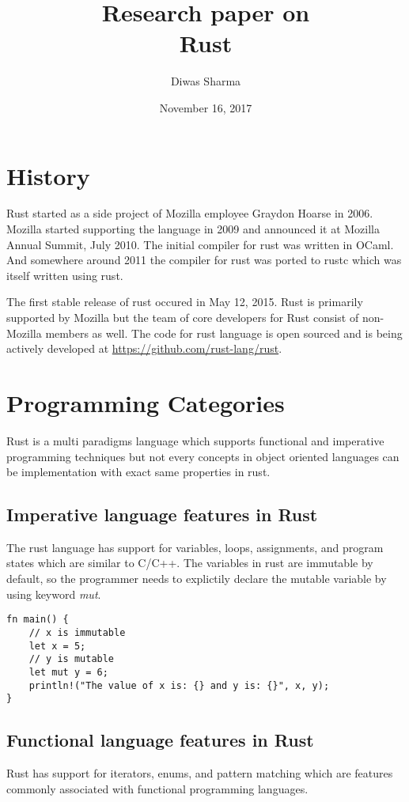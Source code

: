 \documentclass[12pt, titlepage]{article}
\title{\large{Research paper} on \\ \textbf{Rust}}
\author{Diwas Sharma}
\date{November 16, 2017}
\begin{document}
\maketitle

\section{History}
Rust started as a side project of Mozilla employee Graydon Hoarse in 2006. Mozilla started supporting the language in
2009 and announced it at Mozilla Annual Summit, July 2010\cite{ProjectServo}. The initial compiler for rust was written
in OCaml. And somewhere around 2011 the compiler for rust was ported to rustc which was itself written using rust.

The first stable release of rust occured in May 12, 2015\cite{AnnounceRust}. Rust is primarily supported
by Mozilla but the team of core developers for Rust consist of non-Mozilla members as well. The
code for rust language is open sourced and is being actively developed at \href{https://github.com/rust-lang/rust}{https://github.com/rust-lang/rust}.

\section{Programming Categories}
Rust is a multi paradigms language which supports functional and imperative programming techniques but not every concepts in object oriented languages
can be implementation with exact same properties in rust.

\subsection{Imperative language features in Rust}
The rust language has support for variables, loops, assignments, and program states which are similar to C/C++. The variables in rust are immutable by
default, so the programmer needs to explictily declare the mutable variable by using keyword \textit{mut}.

\begin{lstlisting}
fn main() {
    // x is immutable
    let x = 5;
    // y is mutable
    let mut y = 6;
    println!("The value of x is: {} and y is: {}", x, y);
}
\end{lstlisting}

\subsection{Functional language features in Rust}
Rust has support for iterators, enums, and pattern matching which are features commonly associated with
functional programming languages.
\end{document}
